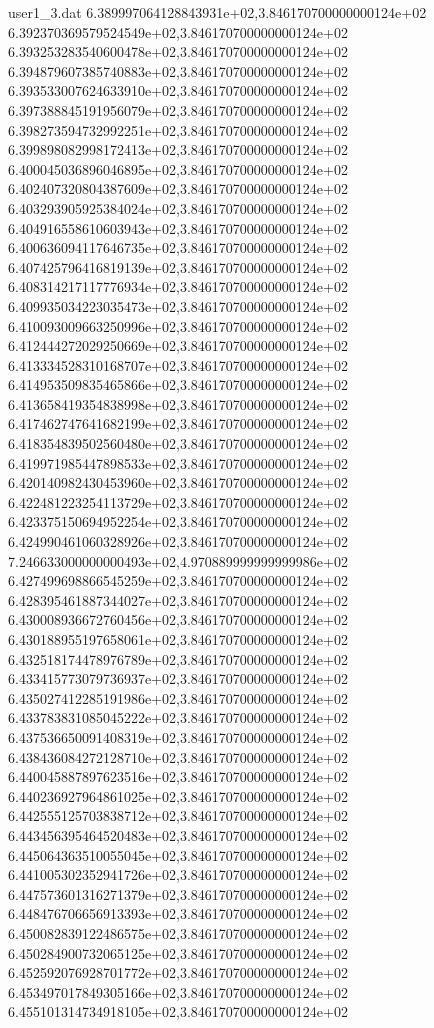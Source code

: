 \begin{filecontents}{user1_3.dat}
6.389997064128843931e+02,3.846170700000000124e+02
6.392370369579524549e+02,3.846170700000000124e+02
6.393253283540600478e+02,3.846170700000000124e+02
6.394879607385740883e+02,3.846170700000000124e+02
6.393533007624633910e+02,3.846170700000000124e+02
6.397388845191956079e+02,3.846170700000000124e+02
6.398273594732992251e+02,3.846170700000000124e+02
6.399898082998172413e+02,3.846170700000000124e+02
6.400045036896046895e+02,3.846170700000000124e+02
6.402407320804387609e+02,3.846170700000000124e+02
6.403293905925384024e+02,3.846170700000000124e+02
6.404916558610603943e+02,3.846170700000000124e+02
6.400636094117646735e+02,3.846170700000000124e+02
6.407425796416819139e+02,3.846170700000000124e+02
6.408314217117776934e+02,3.846170700000000124e+02
6.409935034223035473e+02,3.846170700000000124e+02
6.410093009663250996e+02,3.846170700000000124e+02
6.412444272029250669e+02,3.846170700000000124e+02
6.413334528310168707e+02,3.846170700000000124e+02
6.414953509835465866e+02,3.846170700000000124e+02
6.413658419354838998e+02,3.846170700000000124e+02
6.417462747641682199e+02,3.846170700000000124e+02
6.418354839502560480e+02,3.846170700000000124e+02
6.419971985447898533e+02,3.846170700000000124e+02
6.420140982430453960e+02,3.846170700000000124e+02
6.422481223254113729e+02,3.846170700000000124e+02
6.423375150694952254e+02,3.846170700000000124e+02
6.424990461060328926e+02,3.846170700000000124e+02
7.246633000000000493e+02,4.970889999999999986e+02
6.427499698866545259e+02,3.846170700000000124e+02
6.428395461887344027e+02,3.846170700000000124e+02
6.430008936672760456e+02,3.846170700000000124e+02
6.430188955197658061e+02,3.846170700000000124e+02
6.432518174478976789e+02,3.846170700000000124e+02
6.433415773079736937e+02,3.846170700000000124e+02
6.435027412285191986e+02,3.846170700000000124e+02
6.433783831085045222e+02,3.846170700000000124e+02
6.437536650091408319e+02,3.846170700000000124e+02
6.438436084272128710e+02,3.846170700000000124e+02
6.440045887897623516e+02,3.846170700000000124e+02
6.440236927964861025e+02,3.846170700000000124e+02
6.442555125703838712e+02,3.846170700000000124e+02
6.443456395464520483e+02,3.846170700000000124e+02
6.445064363510055045e+02,3.846170700000000124e+02
6.441005302352941726e+02,3.846170700000000124e+02
6.447573601316271379e+02,3.846170700000000124e+02
6.448476706656913393e+02,3.846170700000000124e+02
6.450082839122486575e+02,3.846170700000000124e+02
6.450284900732065125e+02,3.846170700000000124e+02
6.452592076928701772e+02,3.846170700000000124e+02
6.453497017849305166e+02,3.846170700000000124e+02
6.455101314734918105e+02,3.846170700000000124e+02

\end{filecontents}
